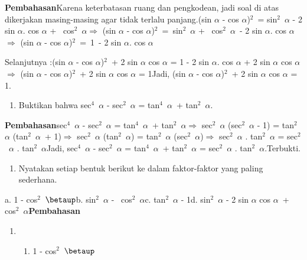 \documentclass[11pt,fleqn]{book} %
\begin{document}
\noindent \textbf{Pembahasan}Karena keterbatasan ruang dan pengkodean, jadi soal di atas dikerjakan masing-masing agar tidak terlalu panjang.(sin $\alpha$ - cos $\alpha$)${}^{2}$~= sin${}^{2}$~$\alpha$ - 2 sin $\alpha$. cos $\alpha$ +~ cos${}^{2}$~$\alpha$$\mathrm{\Rightarrow }$ (sin $\alpha$ - cos $\alpha$)${}^{2}$~=~sin${}^{2}$~$\alpha$ +~ cos${}^{2}$~$\alpha$~- 2 sin $\alpha$. cos $\alpha$$\mathrm{\Rightarrow }$ (sin $\alpha$ - cos $\alpha$)${}^{2}$~=~1~- 2 sin $\alpha$. cos $\alpha$

\noindent Selanjutnya :(sin $\alpha$ - cos $\alpha$)${}^{2}$~+ 2 sin $\alpha$ cos $\alpha$ = 1 - 2 sin $\alpha$. cos $\alpha$ + 2 sin $\alpha$ cos $\alpha$$\mathrm{\Rightarrow }$ (sin $\alpha$ - cos $\alpha$)${}^{2}$~+ 2 sin $\alpha$ cos $\alpha$ = 1Jadi, (sin $\alpha$ - cos $\alpha$)${}^{2}$~+ 2 sin $\alpha$ cos $\alpha$ = 1.

\begin{enumerate}
\item  Buktikan bahwa sec${}^{4}$~$\alpha$ - sec${}^{2}$~$\alpha$ = tan${}^{4}$~$\alpha$~+ tan${}^{2}$~$\alpha$.
\end{enumerate}

\noindent \textbf{Pembahasan}sec${}^{4}$~$\alpha$ - sec${}^{2}$~$\alpha$ = tan${}^{4}$~$\alpha$~+ tan${}^{2}$~$\alpha$$\mathrm{\Rightarrow }$ sec${}^{2}$~$\alpha$ (sec${}^{2}$~$\alpha$ - 1) = tan${}^{2}$~$\alpha$ (tan${}^{2}$~$\alpha$~+ 1)$\mathrm{\Rightarrow }$ sec${}^{2}$~$\alpha$ (tan${}^{2}$~$\alpha$) = tan${}^{2}$~$\alpha$ (sec${}^{2}$~$\alpha$)$\mathrm{\Rightarrow }$ sec${}^{2}$~$\alpha$ . tan${}^{2}$~$\alpha$ = sec${}^{2}$~$\alpha$ . tan${}^{2}$~$\alpha$Jadi, sec${}^{4}$~$\alpha$ - sec${}^{2}$~$\alpha$ = tan${}^{4}$~$\alpha$~+ tan${}^{2}$~$\alpha$ = sec${}^{2}$~$\alpha$ . tan${}^{2}$~$\alpha$.Terbukti.

\begin{enumerate}
\item  Nyatakan setiap bentuk berikut ke dalam faktor-faktor yang paling sederhana.
\end{enumerate}

\noindent a. 1 - cos${}^{2}$~$\betaup$b. sin${}^{2}$~$\alpha$ -~ cos${}^{2}$~$\alpha$c. tan${}^{2}$~$\alpha$ - 1d. sin${}^{2}$~$\alpha$ - 2 sin $\alpha$ cos $\alpha$~+ cos${}^{2}$~$\alpha$\textbf{Pembahasan}

\begin{enumerate}
\item \begin{enumerate}
\item  1 - cos${}^{2}$~$\betaup$
\end{enumerate}
\end{enumerate}
\end{document}
